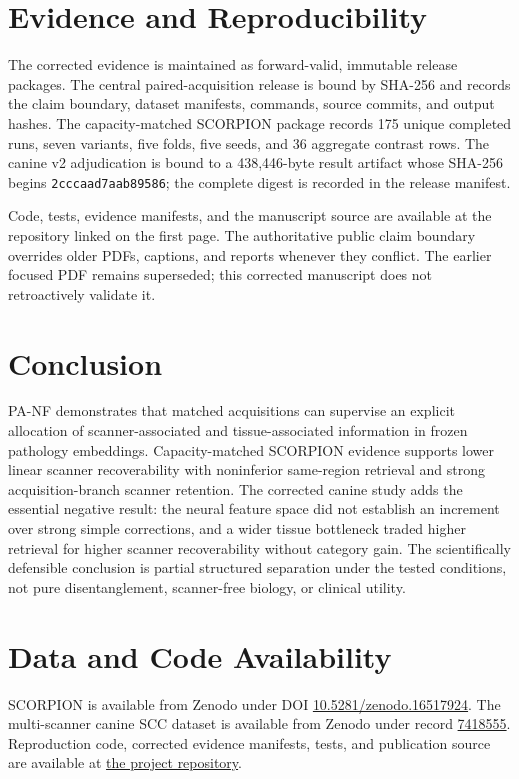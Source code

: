 \section{Evidence and Reproducibility}
The corrected evidence is maintained as forward-valid, immutable release packages. The central paired-acquisition release is bound by SHA-256 and records the claim boundary, dataset manifests, commands, source commits, and output hashes. The capacity-matched SCORPION package records 175 unique completed runs, seven variants, five folds, five seeds, and 36 aggregate contrast rows. The canine v2 adjudication is bound to a 438,446-byte result artifact whose SHA-256 begins \texttt{2cccaad7aab89586}; the complete digest is recorded in the release manifest.

Code, tests, evidence manifests, and the manuscript source are available at the repository linked on the first page. The authoritative public claim boundary overrides older PDFs, captions, and reports whenever they conflict. The earlier focused PDF remains superseded; this corrected manuscript does not retroactively validate it.

\section{Conclusion}
PA-NF demonstrates that matched acquisitions can supervise an explicit allocation of scanner-associated and tissue-associated information in frozen pathology embeddings. Capacity-matched SCORPION evidence supports lower linear scanner recoverability with noninferior same-region retrieval and strong acquisition-branch scanner retention. The corrected canine study adds the essential negative result: the neural feature space did not establish an increment over strong simple corrections, and a wider tissue bottleneck traded higher retrieval for higher scanner recoverability without category gain. The scientifically defensible conclusion is partial structured separation under the tested conditions, not pure disentanglement, scanner-free biology, or clinical utility.

\section*{Data and Code Availability}
SCORPION is available from Zenodo under DOI \href{https://doi.org/10.5281/zenodo.16517924}{10.5281/zenodo.16517924}. The multi-scanner canine SCC dataset is available from Zenodo under record \href{https://zenodo.org/records/7418555}{7418555}. Reproduction code, corrected evidence manifests, tests, and publication source are available at \href{https://github.com/matthewvaishnav/computational-pathology-research}{the project repository}.

